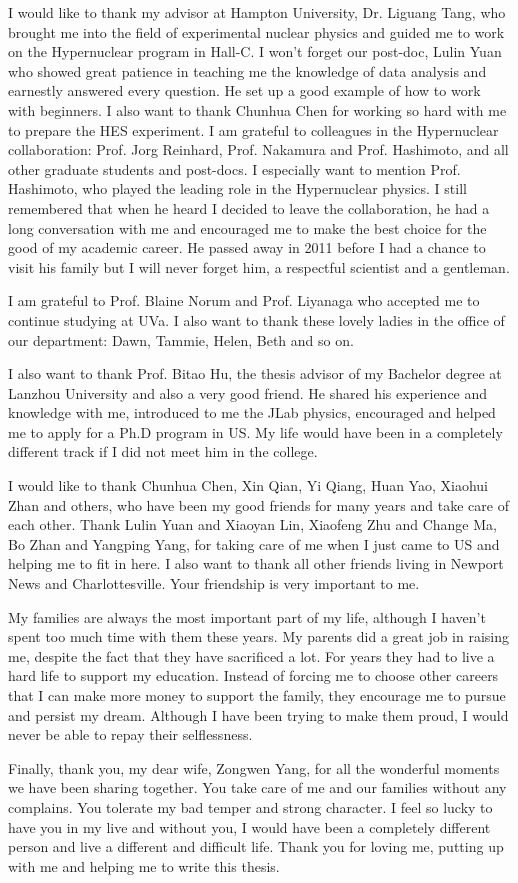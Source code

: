    I would like to thank my advisor at Hampton University, Dr. Liguang Tang, who brought me into the field of experimental nuclear physics and guided me to work on the Hypernuclear program in Hall-C. I won't forget our post-doc, Lulin Yuan who showed great patience in teaching me the knowledge of data analysis and earnestly answered every question. He set up a good example of how to work with beginners. I also want to thank Chunhua Chen for working so hard with me to prepare the HES experiment. I am grateful to colleagues in the Hypernuclear collaboration: Prof. Jorg Reinhard, Prof. Nakamura and Prof. Hashimoto, and all other graduate students and post-docs. I especially want to mention Prof. Hashimoto, who played the leading role in the Hypernuclear physics. I still remembered that when he heard I decided to leave the collaboration, he had a long conversation with me and encouraged me to make the best choice for the good of my academic career. He passed away in 2011 before I had a chance to visit his family but I will never forget him, a respectful scientist and a gentleman.

   I am grateful to Prof. Blaine Norum and Prof. Liyanaga who accepted me to continue studying at UVa. I also want to thank these lovely ladies in the office of our department: Dawn, Tammie, Helen, Beth and so on. 
   
   I also want to thank Prof. Bitao Hu, the thesis advisor of my Bachelor degree at Lanzhou University and also a very good friend. He shared his experience and knowledge with me, introduced to me the JLab physics, encouraged and helped me to apply for a Ph.D program in US. My life would have been in a completely different track if I did not meet him in the college.
   
   I would like to thank Chunhua Chen, Xin Qian, Yi Qiang, Huan Yao, Xiaohui Zhan and others, who have been my good friends for many years and take care of each other. Thank Lulin Yuan and Xiaoyan Lin, Xiaofeng Zhu and Change Ma, Bo Zhan and Yangping Yang, for taking care of me when I just came to US and helping me to fit in here. I also want to thank all other friends living in Newport News and Charlottesville. Your friendship is very important to me.
   
   My families are always the most important part of my life, although I haven't spent too much time with them these years. My parents did a great job in raising me, despite the fact that they have sacrificed a lot. For years they had to live a hard life to support my education. Instead of forcing me to choose other careers that I can make more money to support the family, they encourage me to pursue and persist my dream. Although I have been trying to make them proud, I would never be able to repay their selflessness.
   
   Finally, thank you, my dear wife, Zongwen Yang, for all the wonderful moments we have been sharing together. You take care of me and our families without any complains. You tolerate my bad temper and strong character. I feel so lucky to have you in my live and without you, I would have been a completely different person and live a different and difficult life. Thank you for loving me, putting up with me and helping me to write this thesis. 